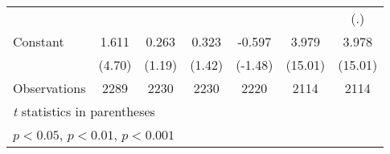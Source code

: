 \begin{table*}[htbp]
\begin{tabular}{l*{6}{c}}
                    &                     &                     &                     &                     &                     &         (.)         \\
[1em]
Constant            &       1.611\sym{***}&       0.263         &       0.323         &      -0.597         &       3.979\sym{***}&       3.978\sym{***}\\
                    &      (4.70)         &      (1.19)         &      (1.42)         &     (-1.48)         &     (15.01)         &     (15.01)         \\
\hline
Observations        &        2289         &        2230         &        2230         &        2220         &        2114         &        2114         \\
\hline\hline
\multicolumn{7}{l}{\footnotesize \textit{t} statistics in parentheses}\\
\multicolumn{7}{l}{\footnotesize \sym{*} \(p<0.05\), \sym{**} \(p<0.01\), \sym{***} \(p<0.001\)}\\
\end{tabular}
\end{table*}
